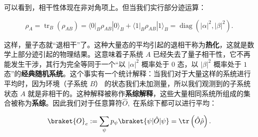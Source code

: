 可以看到，相干性体现在非对角项上。但当我们实行部分迹运算：
\begin{linenomath}\begin{equation} {\rho }_{A} = {\operatorname{tr}}_{B}\left( {\rho }_{AB}\right)  = \langle {\left. 0\right| }_{B}{\rho }_{AB}\left| {0{\rangle }_{B}+\langle 1{\left. \right| }_{B}{\rho }_{AB}}\right| 1{\rangle }_{B}  = \operatorname{diag}\left( |\alpha|^2 , |\beta|^2\right).\end{equation}\end{linenomath}
这样，量子态就“退相干”了。这种大量态的平均引起的退相干称为\textbf{热化}，这就是数学上部分迹引起的物理结果。这意味着子系统 $A$ 已经失去了量子相干性，它不再能发生干涉，其行为完全等同于一个“以 $|\alpha|^2$ 概率处于 $0$ 态，以 $|\beta|^2$ 概率处于 $1$ 态”的\textbf{经典随机系统}。这个事实有一个统计解释：当我们对于大量这样的系统进行平均时，因为环境（子系统 $B$） 的状态我们未加测量，所以我们观测到的子系统状态 $A$ 就是非相干的。这种解释被称作\textbf{系综解释}，这些大量相同系统所组成的集合被称为\textbf{系综}。因此我们对于任意算符$\hat O,$ 在系综下都可以进行平均：
\begin{linenomath}\begin{equation}
\braket{O}_{e} := \sum_{\psi} p_\psi \braket{\psi|\hat{O}|\psi} = \tr\left( \hat{O}\hat{\rho} \right).
\end{equation}\end{linenomath}

